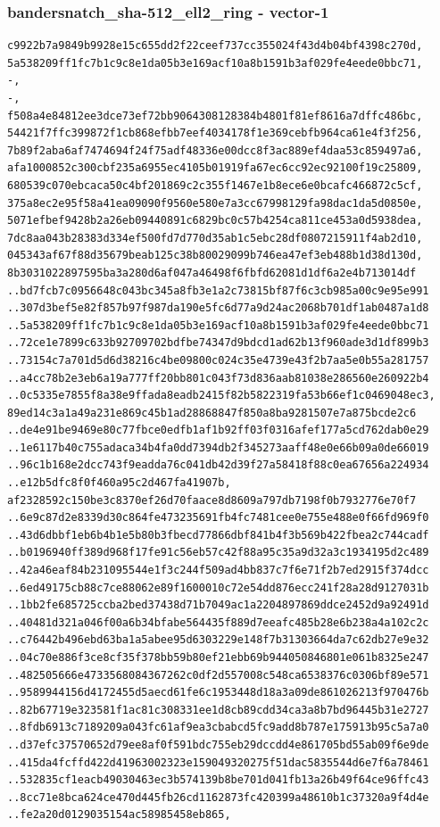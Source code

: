 \documentclass[
]{article}
\begin{document}
\subsubsection{bandersnatch\_sha-512\_ell2\_ring -
vector-1}\label{bandersnatch_sha-512_ell2_ring---vector-1}

\begin{verbatim}
c9922b7a9849b9928e15c655dd2f22ceef737cc355024f43d4b04bf4398c270d,
5a538209ff1fc7b1c9c8e1da05b3e169acf10a8b1591b3af029fe4eede0bbc71,
-,
-,
f508a4e84812ee3dce73ef72bb9064308128384b4801f81ef8616a7dffc486bc,
54421f7ffc399872f1cb868efbb7eef4034178f1e369cebfb964ca61e4f3f256,
7b89f2aba6af7474694f24f75adf48336e00dcc8f3ac889ef4daa53c859497a6,
afa1000852c300cbf235a6955ec4105b01919fa67ec6cc92ec92100f19c25809,
680539c070ebcaca50c4bf201869c2c355f1467e1b8ece6e0bcafc466872c5cf,
375a8ec2e95f58a41ea09090f9560e580e7a3cc67998129fa98dac1da5d0850e,
5071efbef9428b2a26eb09440891c6829bc0c57b4254ca811ce453a0d5938dea,
7dc8aa043b28383d334ef500fd7d770d35ab1c5ebc28df0807215911f4ab2d10,
045343af67f88d35679beab125c38b80029099b746ea47ef3eb488b1d38d130d,
8b3031022897595ba3a280d6af047a46498f6fbfd62081d1df6a2e4b713014df
..bd7fcb7c0956648c043bc345a8fb3e1a2c73815bf87f6c3cb985a00c9e95e991
..307d3bef5e82f857b97f987da190e5fc6d77a9d24ac2068b701df1ab0487a1d8
..5a538209ff1fc7b1c9c8e1da05b3e169acf10a8b1591b3af029fe4eede0bbc71
..72ce1e7899c633b92709702bdfbe74347d9bdcd1ad62b13f960ade3d1df899b3
..73154c7a701d5d6d38216c4be09800c024c35e4739e43f2b7aa5e0b55a281757
..a4cc78b2e3eb6a19a777ff20bb801c043f73d836aab81038e286560e260922b4
..0c5335e7855f8a38e9ffada8eadb2415f82b5822319fa53b66ef1c0469048ec3,
89ed14c3a1a49a231e869c45b1ad28868847f850a8ba9281507e7a875bcde2c6
..de4e91be9469e80c77fbce0edfb1af1b92ff03f0316afef177a5cd762dab0e29
..1e6117b40c755adaca34b4fa0dd7394db2f345273aaff48e0e66b09a0de66019
..96c1b168e2dcc743f9eadda76c041db42d39f27a58418f88c0ea67656a224934
..e12b5dfc8f0f460a95c2d467fa41907b,
af2328592c150be3c8370ef26d70faace8d8609a797db7198f0b7932776e70f7
..6e9c87d2e8339d30c864fe473235691fb4fc7481cee0e755e488e0f66fd969f0
..43d6dbbf1eb6b4b1e5b80b3fbecd77866dbf841b4f3b569b422fbea2c744cadf
..b0196940ff389d968f17fe91c56eb57c42f88a95c35a9d32a3c1934195d2c489
..42a46eaf84b231095544e1f3c244f509ad4bb837c7f6e71f2b7ed2915f374dcc
..6ed49175cb88c7ce88062e89f1600010c72e54dd876ecc241f28a28d9127031b
..1bb2fe685725ccba2bed37438d71b7049ac1a2204897869ddce2452d9a92491d
..40481d321a046f00a6b34bfabe564435f889d7eeafc485b28e6b238a4a102c2c
..c76442b496ebd63ba1a5abee95d6303229e148f7b31303664da7c62db27e9e32
..04c70e886f3ce8cf35f378bb59b80ef21ebb69b944050846801e061b8325e247
..482505666e4733568084367262c0df2d557008c548ca6538376c0306bf89e571
..9589944156d4172455d5aecd61fe6c1953448d18a3a09de861026213f970476b
..82b67719e323581f1ac81c308331ee1d8cb89cdd34ca3a8b7bd96445b31e2727
..8fdb6913c7189209a043fc61af9ea3cbabcd5fc9add8b787e175913b95c5a7a0
..d37efc37570652d79ee8af0f591bdc755eb29dccdd4e861705bd55ab09f6e9de
..415da4fcffd422d41963002323e159049320275f51dac5835544d6e7f6a78461
..532835cf1eacb49030463ec3b574139b8be701d041fb13a26b49f64ce96ffc43
..8cc71e8bca624ce470d445fb26cd1162873fc420399a48610b1c37320a9f4d4e
..fe2a20d0129035154ac58985458eb865,
\end{verbatim}
\end{document}
